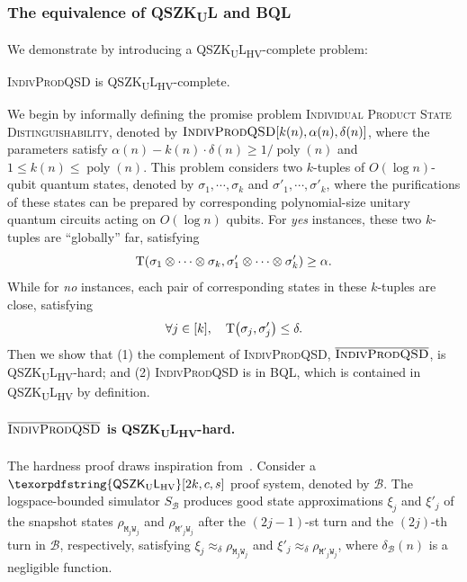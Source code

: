 \documentclass[11pt, a4paper]{article}
\numberwithin{equation}{section}
\numberwithin{figure}{section}
\newcommand{\QSZKUL}{\texorpdfstring{\textnormal{\textsf{QSZK}\textsubscript{\textnormal{U}}\textsf{L}}}\xspace}
\newcommand{\QSZKULHV}{\texorpdfstring{\textnormal{\textsf{QSZK}\textsubscript{\textnormal{U}}\textsf{L}}\textsubscript{\textnormal{HV}}}\xspace}
\newcommand{\BQL}{\textnormal{\textsf{BQL}}\xspace}
\newcommand{\textoverline}[1]{$\overline{\mbox{#1}}$}
\newcommand{\IndivProdQSD}{\textnormal{\textsc{IndivProdQSD}}\xspace}
\newcommand{\coIndivProdQSD}{\texorpdfstring{\textnormal{\textoverline{\textsc{IndivProdQSD}}}}\xspace}
\DeclarePairedDelimiter\rbra{\lparen}{\rparen}
\newcommand{\td}{\mathrm{T}}
\DeclareMathOperator\poly{poly}
\newcommand{\calB}{\mathcal{B}}
\newcommand{\ttM}{\mathtt{M}}
\newcommand{\ttW}{\mathtt{W}}
\begin{document}
\subsubsection{The equivalence of \QSZKUL{} and \BQL{}}

We demonstrate  by introducing a \QSZKULHV{}-complete problem: 

\begin{theorem}
    \label{thm:IndivProdQSD-QSZKLcomplete-informal}
    \IndivProdQSD{} is \QSZKULHV{}-complete.
\end{theorem}

We begin by informally defining the promise problem \textsc{Individual Product State Distinguishability}, denoted by $\IndivProdQSD[k(n),\alpha(n),\delta(n)]$, where the parameters satisfy $\alpha(n) - k(n) \cdot \delta(n) \geq 1/\poly(n)$ and $1 \leq k(n) \leq \poly(n)$. This problem considers two $k$-tuples of $O(\log n)$-qubit quantum states, denoted by $\sigma_1,\cdots,\sigma_k$ and $\sigma'_1,\cdots,\sigma'_k$, where the purifications of these states can be prepared by corresponding polynomial-size unitary quantum circuits acting on $O(\log n)$ qubits. For \textit{yes} instances, these two $k$-tuples are ``globally'' far, satisfying
\begin{equation}
    \label{eq:intro-far}
    \td\rbra*{\sigma_1 \otimes \cdots \otimes \sigma_k, \sigma'_1 \otimes \cdots \otimes \sigma'_k} \geq \alpha. 
\end{equation}
While for \textit{no} instances, each pair of corresponding states in these $k$-tuples are close, satisfying
\begin{equation}
    \label{eq:intro-indiv-close}
    \forall j \in [k], \quad \td\rbra*{\sigma_j,\sigma'_j} \leq \delta.
\end{equation}
Then we show that (1) the complement of \IndivProdQSD{}, 
\coIndivProdQSD{}, is \QSZKULHV{}-hard; and (2) 
\IndivProdQSD{} is in \BQL{}, which is contained in \QSZKULHV{} by definition.

\paragraph{\coIndivProdQSD{} is \QSZKULHV{}-hard.} The hardness proof draws inspiration from~\cite[Section 5]{Wat02QSZK}. Consider a $\QSZKULHV[2k,c,s]$ proof system, denoted by $\calB$. The logspace-bounded simulator $S_{\calB}$ produces good state approximations $\xi_j$ and $\xi'_j$ of the snapshot states $\rho_{\ttM_j\ttW_j}$ and $\rho_{\ttM'_j\ttW_j}$ after the $(2j-1)$-st turn and the $(2j)$-th turn in $\calB$, respectively, satisfying $\xi_j \approx_{\delta} \rho_{\ttM_j\ttW_j}$ and $\xi'_j \approx_{\delta} \rho_{\ttM'_j\ttW_j}$, where $\delta_{\calB}(n)$ is a negligible function. 
\end{document}
